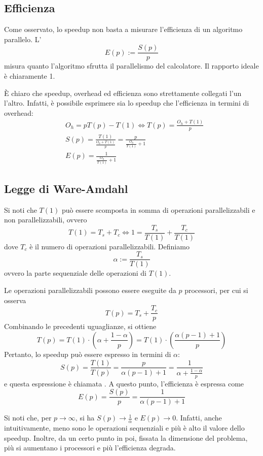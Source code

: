 \subsection{Efficienza}
Come osservato, lo speedup non basta a misurare l'efficienza di un algoritmo parallelo. L' 
$$E(p) := \frac{S(p)}{p}$$
misura quanto l'algoritmo sfrutta il parallelismo del calcolatore. Il rapporto ideale è chiaramente 1.

\begin{note}{}
  È chiaro che speedup, overhead ed efficienza sono strettamente collegati l'un l'altro. Infatti, è possibile esprimere sia lo speedup che l'efficienza in termini di overhead:
  \begin{equation*}
    \begin{aligned}
      &O_{h}=pT(p)-T(1) \iff T(p)=\frac{O_{h} + T(1)}{p} \\
      &S(p)=\frac{T(1)}{\frac{O_{h} + T(1)}{p}}=\frac{p}{\frac{O_{h}}{T(1)} + 1} \\
      &E(p)=\frac{1}{\frac{O_{h}}{T(1)} + 1}
    \end{aligned}
  \end{equation*}
\end{note}

\subsection{Legge di Ware-Amdahl}
Si noti che $T(1)$ può essere scomposta in somma di operazioni parallelizzabili e non parallelizzabili, ovvero
$$T(1)=T_s + T_c \iff 1=\frac{T_{s}}{T(1)} + \frac{T_{c}}{T(1)}$$
dove $T_c$ è il numero di operazioni parallelizzabili. Definiamo 
$$\alpha:=\frac{T_{s}}{T(1)}$$
ovvero la parte sequenziale delle operazioni di $T(1)$.

Le operazioni parallelizzabili possono essere eseguite da $p$ processori, per cui si osserva $$T(p)= T_s + \frac{T_c}{p}$$
Combinando le precedenti uguaglianze, si ottiene $$T(p)=T(1)\cdot\left(\alpha+\frac{{1-\alpha}}{p}\right)=T(1)\cdot\left( \frac{{\alpha(p-1)+1}}{p} \right)$$
Pertanto, lo speedup può essere espresso in termini di $\alpha$:
$$S(p)=\frac{T(1)}{T(p)}=\frac{p}{\alpha(p-1)+1}=\frac{1}{\alpha + \frac{1-\alpha}{p}}$$
e questa espressione è chiamata . A questo punto, l'efficienza è espressa come
$$E(p)=\frac{S(p)}{p}=\frac{1}{\alpha(p-1)+1}$$

Si noti che, per $p\to \infty$, si ha $S(p)\rightarrow \frac{1}{\alpha}$ e $E(p)\to 0$. Infatti, anche intuitivamente, meno sono le operazioni sequenziali e più è alto il valore dello speedup. Inoltre, da un certo punto in poi, fissata la dimensione del problema, più si aumentano i processori e più l'efficienza degrada.


